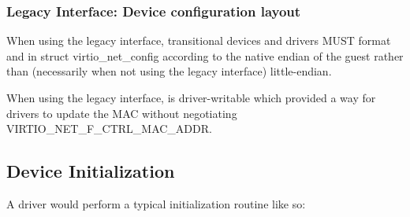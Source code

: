 \subsubsection{Legacy Interface: Device configuration layout}\label{sec:Device Types / Network Device / Device configuration layout / Legacy Interface: Device configuration layout}
\label{sec:Device Types / Block Device / Feature bits / Device configuration layout / Legacy Interface: Device configuration layout}
When using the legacy interface, transitional devices and drivers
MUST format  and
 in struct virtio_net_config
according to the native endian of the guest rather than
(necessarily when not using the legacy interface) little-endian.

When using the legacy interface,  is driver-writable
which provided a way for drivers to update the MAC without
negotiating VIRTIO_NET_F_CTRL_MAC_ADDR.

\subsection{Device Initialization}\label{sec:Device Types / Network Device / Device Initialization}

A driver would perform a typical initialization routine like so:


